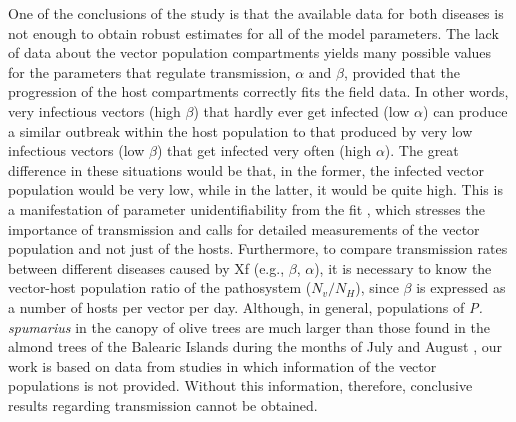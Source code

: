 One of the conclusions of the study is that the available data for both
diseases is not enough to obtain robust estimates for all of the model
parameters. The lack of data about the vector population compartments yields
many possible values for the parameters that regulate transmission, $\alpha$
and $\beta$, provided that the progression of the host compartments correctly
fits the field data. In other words, very infectious vectors (high $\beta$)
that hardly ever get infected (low $\alpha$) can produce a similar outbreak
within the host population to that produced by very low infectious vectors (low
$\beta$) that get infected very often (high $\alpha$). The great difference in
these situations would be that, in the former, the infected vector population
would be very low, while in the latter, it would be quite high. This is a
manifestation of parameter unidentifiability from the fit
\cite{Chowel2017,Roosa2019}, which stresses the importance of transmission
and calls for detailed measurements of the vector population and not just of
the hosts. Furthermore, to compare transmission rates between different
diseases caused by Xf (e.g., $\beta$, $\alpha$), it is necessary to know the
vector-host population ratio of the pathosystem ($N_v/N_H$), since $\beta$ is
expressed as a number of hosts per vector per day. Although, in general,
populations of \textit{P. spumarius} in the canopy of olive trees are much
larger than those found in the almond trees of the Balearic Islands during the
months of July and August \cite{Lopez2021},
our work is based on data from studies in which information of the vector
populations is not provided. Without this information, therefore, conclusive
results regarding transmission cannot be obtained.


